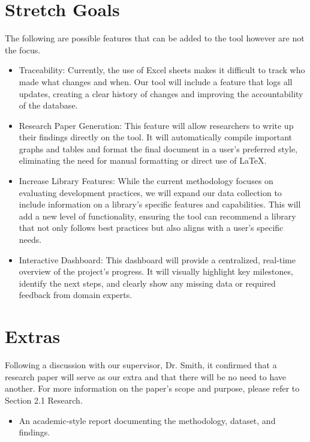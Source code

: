 \documentclass{article}
\begin{document}
\begin{itemize}
\begin{itemize}
\section{Stretch Goals}
The following are possible features that can be added to the tool however are not the focus.
\begin{itemize}
    \item Traceability: Currently, the use of Excel sheets makes it difficult to track who made what changes and when. Our tool will include a feature that logs all updates, creating a clear history of changes and improving the accountability of the database.
    \item Research Paper Generation: This feature will allow researchers to write up their findings directly on the tool. It will automatically compile important graphs and tables and format the final document in a user's preferred style, eliminating the need for manual formatting or direct use of LaTeX.
    \item Increase Library Features: While the current methodology focuses on evaluating development practices, we will expand our data collection to include information on a library's specific features and capabilities. This will add a new level of functionality, ensuring the tool can recommend a library that not only follows best practices but also aligns with a user's specific needs.
    \item Interactive Dashboard: This dashboard will provide a centralized, real-time overview of the project's progress. It will visually highlight key milestones, identify the next steps, and clearly show any missing data or required feedback from domain experts.
\end{itemize}
\section{Extras}
Following a discussion with our supervisor, Dr. Smith, it confirmed that a research paper will serve as our extra and that there will be no need to have another.
For more information on the paper's scope and purpose, please refer to Section 2.1 Research.

\begin{itemize}
  \item An academic-style report documenting the methodology, dataset, and findings.
\end{itemize}


\end{itemize}
\end{itemize}
\end{document}
